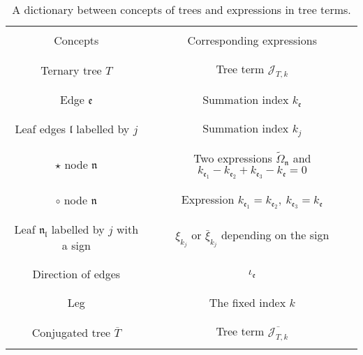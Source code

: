\begin{table}[H]
\begin{center}
 \begin{longtable}{|c|c|}
 \hline
 & \\
 Concepts & Corresponding expressions \\
 & \\
 \hline
 & \\
 Ternary tree $T$ & Tree term $\mathcal{J}_{T,k}$\\
 & \\
 \hline
 & \\
 Edge $\mathfrak{e}$ & Summation index $k_{\mathfrak{e}}$\\
 & \\
 \hline
 & \\
 Leaf edges $\mathfrak{l}$ labelled by $j$ & Summation index $k_{j}$\\
 & \\
 \hline
 & \\
 $\star$ node $\mathfrak{n}$ & Two expressions $\widetilde{\Omega}_{\mathfrak{n}}$ and $k_{\mathfrak{e}_1}-k_{\mathfrak{e}_2}+k_{\mathfrak{e}_3}-k_{\mathfrak{e}}=0$\\
 & \\
 \hline
 & \\
 $\circ$ node $\mathfrak{n}$ & Expression $k_{\mathfrak{e}_1}=k_{\mathfrak{e}_2},\ k_{\mathfrak{e}_3}=k_{\mathfrak{e}}$\\
 & \\
 \hline
 & \\
 Leaf $\mathfrak{n}_{\mathfrak{l}}$ labelled by $j$ with a sign & $\xi_{k_j}$ or $\bar{\xi}_{k_j}$ depending on the sign\\
 & \\
 \hline
 & \\
 Direction of edges & $\iota_{\mathfrak{e}}$\\
 & \\
 \hline
 & \\
 Leg & The fixed index $k$\\
 & \\
 \hline
 & \\
 Conjugated tree $\overline{T}$ & Tree term $\overline{\mathcal{J}_{T,k}}$ \\
 & \\
 \hline
 \end{longtable}
\end{center}
\caption{\label{tab.dict} A dictionary between concepts of trees and expressions in tree terms.}
\end{table}

